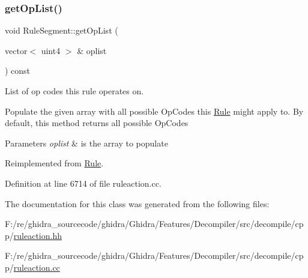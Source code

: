 \subsubsection{\texorpdfstring{getOpList()}{getOpList()}}
{\footnotesize\ttfamily void Rule\+Segment\+::get\+Op\+List (\begin{DoxyParamCaption}\item[{vector$<$ uint4 $>$ \&}]{oplist }\end{DoxyParamCaption}) const\hspace{0.3cm}{\ttfamily [virtual]}}



List of op codes this rule operates on. 

Populate the given array with all possible Op\+Codes this \mbox{\hyperlink{class_rule}{Rule}} might apply to. By default, this method returns all possible Op\+Codes 
\begin{DoxyParams}{Parameters}
{\em oplist} & is the array to populate \\
\hline
\end{DoxyParams}


Reimplemented from \mbox{\hyperlink{class_rule_a4023bfc7825de0ab866790551856d10e}{Rule}}.



Definition at line 6714 of file ruleaction.\+cc.



The documentation for this class was generated from the following files\+:\begin{DoxyCompactItemize}
\item 
F\+:/re/ghidra\+\_\+sourcecode/ghidra/\+Ghidra/\+Features/\+Decompiler/src/decompile/cpp/\mbox{\hyperlink{ruleaction_8hh}{ruleaction.\+hh}}\item 
F\+:/re/ghidra\+\_\+sourcecode/ghidra/\+Ghidra/\+Features/\+Decompiler/src/decompile/cpp/\mbox{\hyperlink{ruleaction_8cc}{ruleaction.\+cc}}\end{DoxyCompactItemize}
